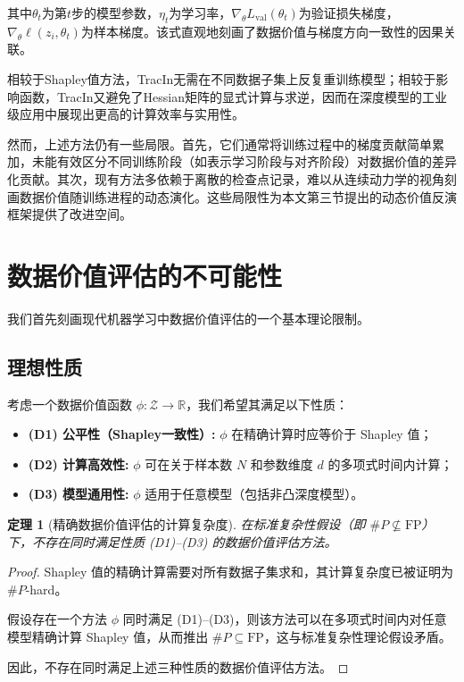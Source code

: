 \documentclass[12pt,a4paper]{ctexart}
\theoremstyle{definition}
\theoremstyle{plain}
\newtheorem{theorem}{定理}[section]
\begin{document}
其中$\theta_t$为第$t$步的模型参数，$\eta_t$为学习率，$\nabla_{\theta} L_{\mathrm{val}}(\theta_t)$为验证损失梯度，$\nabla_{\theta} \ell(z_i, \theta_t)$为样本梯度。该式直观地刻画了数据价值与梯度方向一致性的因果关联。

相较于Shapley值方法，TracIn无需在不同数据子集上反复重训练模型；相较于影响函数，TracIn又避免了Hessian矩阵的显式计算与求逆，因而在深度模型的工业级应用中展现出更高的计算效率与实用性。

然而，上述方法仍有一些局限。首先，它们通常将训练过程中的梯度贡献简单累加，未能有效区分不同训练阶段（如表示学习阶段与对齐阶段）对数据价值的差异化贡献。其次，现有方法多依赖于离散的检查点记录，难以从连续动力学的视角刻画数据价值随训练进程的动态演化。这些局限性为本文第三节提出的动态价值反演框架提供了改进空间。

\section{数据价值评估的不可能性}
\label{sec:nfl}

我们首先刻画现代机器学习中数据价值评估的一个基本理论限制。

\subsection{理想性质}

考虑一个数据价值函数 $\phi: \mathcal{Z} \to \mathbb{R}$，我们希望其满足以下性质：

\begin{itemize}
    \item \textbf{(D1) 公平性（Shapley一致性）:} $\phi$ 在精确计算时应等价于 Shapley 值；
    
    \item \textbf{(D2) 计算高效性:} $\phi$ 可在关于样本数 $N$ 和参数维度 $d$ 的多项式时间内计算；
    
    \item \textbf{(D3) 模型通用性:} $\phi$ 适用于任意模型（包括非凸深度模型）。
\end{itemize}

\begin{theorem}[精确数据价值评估的计算复杂度]
\label{thm:nfl}
在标准复杂性假设（即 $\#P \nsubseteq \mathrm{FP}$）下，不存在同时满足性质 (D1)--(D3) 的数据价值评估方法。
\end{theorem}

\begin{proof}
Shapley 值的精确计算需要对所有数据子集求和，其计算复杂度已被证明为$\#P$-hard\cite{andos2012computation}。

假设存在一个方法 $\phi$ 同时满足 (D1)--(D3)，则该方法可以在多项式时间内对任意模型精确计算 Shapley 值，从而推出 $\#P \subseteq \mathrm{FP}$，这与标准复杂性理论假设矛盾。

因此，不存在同时满足上述三种性质的数据价值评估方法。
\end{proof}
\end{document}
